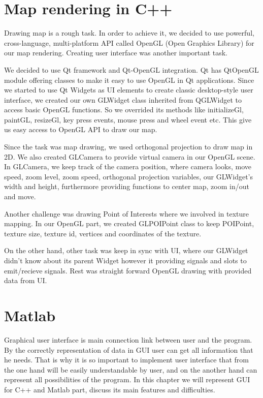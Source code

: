  \section{Map rendering in C++}
  Drawing map is a rough task. In order to achieve it, we decided to use powerful, cross-language, multi-platform API called OpenGL (Open Graphics Library) for our map rendering. Creating user interface was another important task. 
  
  We decided to use Qt framework and Qt-OpenGL integration. Qt has QtOpenGL module offering classes to make it easy to use OpenGL in Qt applications. Since we started to use Qt Widgets as UI elements to create classic desktop-style user interface, we created our own GLWidget class inherited from QGLWidget to access basic OpenGL functions. So we overrided its methods like initializeGl, paintGL, resizeGl, key press events, mouse press and wheel event etc. This give us easy access to OpenGL API to draw our map. 
  
  Since the task was map drawing, we used orthogonal projection to draw map in 2D. We also created GLCamera to provide virtual camera in our OpenGL scene. In GLCamera, we keep track of the camera position, where camera looks, move speed, zoom level, zoom speed, orthogonal projection variables, our GLWidget's width and height, furthermore providing functions to center map, zoom in/out and move. 
  
  Another challenge was drawing Point of Interests where we involved in texture mapping. In our OpenGL part, we created GLPOIPoint class to keep POIPoint, texture size, texture id, vertices and coordinates of the texture. 
  
  On the other hand, other task was keep in sync with UI, where our GLWidget didn't know about its parent Widget however it providing signals and slots to emit/recieve signals. Rest was straight forward OpenGL drawing with provided data from UI.
  
\section{Matlab}
	Graphical user interface is main connection link between user and the program. By the correctly representation of data in GUI user can get all information that he needs. That is why it is so important to implement user interface that from the one hand will be easily understandable by user, and on the another hand can represent all possibilities of the program. In this chapter we will represent GUI for C++ and Matlab part, discuss its main features and difficulties.
	
